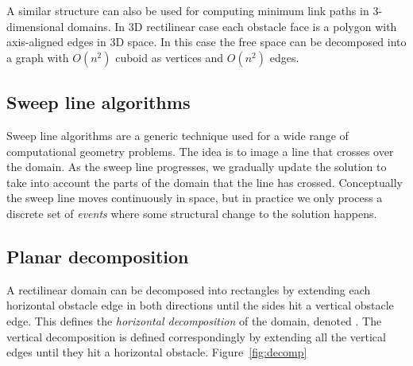 \documentclass[english,gradu]{tktltiki2018}
\begin{document}
A similar structure can also be used for computing minimum link paths in 3-dimensional domains.
In 3D rectilinear case each obstacle face is a polygon with axis-aligned edges in 3D space.
In this case the free space can be decomposed into a graph with $O(n^2)$ cuboid as vertices and $O(n^2)$ edges.


\subsection{Sweep line algorithms}\label{sec:sweep}

Sweep line algorithms are a generic technique used for a wide range of computational geometry problems.
The idea is to image a line that crosses over the domain.
As the sweep line progresses, we gradually update the solution to take into account the parts of the domain that the line has crossed.
Conceptually the sweep line moves continuously in space, but in practice we only process a discrete set of \emph{events} where some structural change to the solution happens.


\subsection{Planar decomposition}\label{sec:decomp2d}

A rectilinear domain can be decomposed into rectangles by extending each horizontal obstacle edge in both directions until the sides hit a vertical obstacle edge.
This defines the \emph{horizontal decomposition} of the domain, denoted .
The vertical decomposition  is defined correspondingly by extending all the vertical edges until they hit a horizontal obstacle.
Figure~\ref{fig:decomp}
\end{document}
